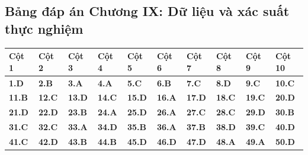 \documentclass[11pt,a4paper]{article}
\begin{document}
\subsection*{\color{primary} Bảng đáp án Chương IX: Dữ liệu và xác suất thực nghiệm}
\begin{center}
\renewcommand{\arraystretch}{1.25}
\begin{tabularx}{\textwidth}{*{10}{>{\centering\arraybackslash}X}}
\toprule
\textbf{\color{primary} Cột 1} & \textbf{\color{primary} Cột 2} & \textbf{\color{primary} Cột 3} & \textbf{\color{primary} Cột 4} & \textbf{\color{primary} Cột 5} & \textbf{\color{primary} Cột 6} & \textbf{\color{primary} Cột 7} & \textbf{\color{primary} Cột 8} & \textbf{\color{primary} Cột 9} & \textbf{\color{primary} Cột 10} \\
\midrule
\textbf{1.D} & \textbf{2.B} & \textbf{3.A} & \textbf{4.A} & \textbf{5.C} & \textbf{6.B} & \textbf{7.C} & \textbf{8.D} & \textbf{9.C} & \textbf{10.C} \\
\rowcolor{rowtint} \textbf{11.B} & \textbf{12.C} & \textbf{13.D} & \textbf{14.C} & \textbf{15.D} & \textbf{16.A} & \textbf{17.D} & \textbf{18.C} & \textbf{19.C} & \textbf{20.D} \\
\textbf{21.D} & \textbf{22.D} & \textbf{23.B} & \textbf{24.A} & \textbf{25.D} & \textbf{26.A} & \textbf{27.C} & \textbf{28.C} & \textbf{29.D} & \textbf{30.B} \\
\rowcolor{rowtint} \textbf{31.C} & \textbf{32.C} & \textbf{33.A} & \textbf{34.D} & \textbf{35.B} & \textbf{36.A} & \textbf{37.B} & \textbf{38.D} & \textbf{39.C} & \textbf{40.D} \\
\textbf{41.C} & \textbf{42.D} & \textbf{43.B} & \textbf{44.B} & \textbf{45.D} & \textbf{46.D} & \textbf{47.D} & \textbf{48.A} & \textbf{49.A} & \textbf{50.D} \\
\bottomrule
\end{tabularx}
\end{center}\vspace{10pt}
\end{document}
